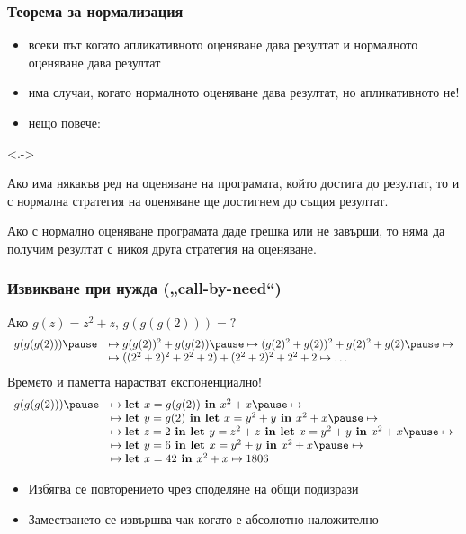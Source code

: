 \documentclass[alsotrans,beameroptions={aspectratio=169}]{beamerswitch}
\begin{document}
\begin{frame}
  \frametitle{Теорема за нормализация}

  \begin{itemize}[<+->]
  \item всеки път когато апликативното оценяване дава резултат и нормалното оценяване дава резултат
  \item има случаи, когато нормалното оценяване дава резултат, но апликативното не!
  \item нещо повече:
  \end{itemize}
  \onslide<.->
  \begin{theorem}
    Ако има някакъв ред на оценяване на програмата, който достига до резултат, то и с нормална стратегия на оценяване ще достигнем до същия резултат.
  \end{theorem}
  \onslide<+->
  \begin{corollary}
    Ако с нормално оценяване програмата даде грешка или не завърши, то няма да получим резултат с \alert{никоя друга стратегия на оценяване}.
  \end{corollary}
\end{frame}

\begin{frame}
  \frametitle{Извикване при нужда („call-by-need“)}

Ако $g(z) = z^2 + z$, $g(g(g(2))) = ?$
\pause
{\small
\begin{equation*}
  \begin{array}{rl}
  g(g(g(2))) \pause &\mapsto g(g(2))^2 + g(g(2)) \pause\mapsto (g(2)^2+ g(2))^2 + g(2)^2 + g(2) \pause\mapsto\\
  &\mapsto ((2^2+2)^2+2^2+2)+(2^2+2)^2 + 2^2+2 \mapsto \ldots
  \end{array}
\end{equation*}}\pause
Времето и паметта нарастват експоненциално!\\
\pause
{}
\pause
{\small
\begin{equation*}
  \begin{array}{rl}
    g(g(g(2))) \pause &\mapsto \lett{x = g(g(2))}{x^2 + x}\pause \mapsto\\
    &\mapsto \lett{y=g(2)}{\lett{x=y^2+y}{x^2 + x}} \pause \mapsto\\
    &\mapsto \lett{z=2}{\lett{y=z^2+z}{\lett{x=y^2+y}{x^2 + x}}} \pause \mapsto\\
    &\mapsto \lett{y=6}{\lett{x = y^2+y}{x^2 + x}} \pause \mapsto\\
    &\mapsto \lett{x=42}{x^2 + x} \mapsto 1806
  \end{array}
\end{equation*}}\pause\vspace{-1.5em}
\begin{itemize}[<+->]
\item Избягва се повторението чрез споделяне на общи подизрази
\item Заместването се извършва чак когато е \alert{абсолютно наложително}
\end{itemize}
\end{frame}
\end{document}
